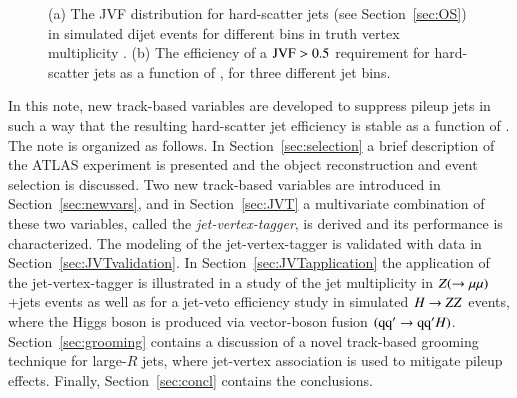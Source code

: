 \documentclass{atlasnote}
\begin{document}
\begin{figure}[!htbp]
  \centering
  \caption{(a) The JVF distribution for hard-scatter jets (see Section~\ref{sec:OS}) in simulated dijet events for different bins in truth vertex 
  multiplicity \NPVtruth.
  (b) The efficiency of a ${\rm JVF}>0.5$ requirement for hard-scatter jets as a function of \NPVtruth, for three different jet \pT bins. 
  \label{fig:JVF_NPVdep}
  }
\end{figure}

In this note, new track-based variables are developed to suppress pileup jets in such
a way that the resulting hard-scatter jet efficiency is stable as a function of \NPV. 
The note is organized as follows. In Section~\ref{sec:selection} a brief description of the ATLAS experiment is presented and the object reconstruction and 
event selection is discussed. Two new track-based variables are introduced in Section~\ref{sec:newvars}, and in Section~\ref{sec:JVT} a multivariate combination 
of these two variables, called the {\it jet-vertex-tagger}, is derived and its performance is characterized. The modeling of the jet-vertex-tagger is 
validated with data in Section~\ref{sec:JVTvalidation}. In Section~\ref{sec:JVTapplication} the application of the jet-vertex-tagger is illustrated in a study of the 
jet multiplicity in $Z(\rightarrow\mu\mu)$+jets events as well as for a jet-veto efficiency study in simulated $H\rightarrow ZZ$ events, where the Higgs boson \Higgs is produced via 
vector-boson fusion $( {\mathrm{q}} {\mathrm{q}}^{\prime} \rightarrow {\mathrm{q}} {\mathrm{q}}^{\prime} H)$. Section~\ref{sec:grooming} contains a discussion of a novel track-based grooming technique for large-$R$ jets, where jet-vertex association is used
to mitigate pileup effects. Finally, Section~\ref{sec:concl} contains the conclusions. 
\end{document}
